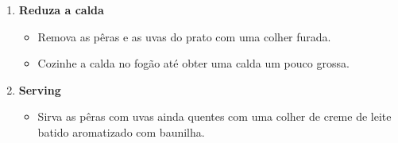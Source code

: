 \documentclass [11pt, letterpaper] {article}
\begin{document}
\begin {description}
\begin {enumerate}
\begin {itemize}
\end {itemize}
\item {\bf Reduza a calda}
\begin {itemize}
\item Remova as p\^eras e as uvas do prato com uma colher furada.
\item Cozinhe a calda no fogão até obter uma calda um pouco grossa.
\end {itemize}
\item {\bf Serving}
\begin {itemize}
\item Sirva as p\^eras com uvas ainda quentes com uma colher de creme de leite batido aromatizado com baunilha.
\end {itemize}
\end {enumerate}
\end {description}
\end{document}
